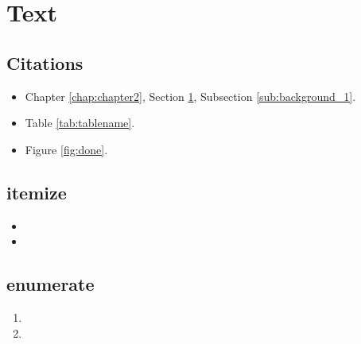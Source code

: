 \documentclass[letterpaper, 12pt, oneside]{book}
\theoremstyle{plain}
\theoremstyle{definition}
\theoremstyle{remark}
\begin{document}
\lipsum[1]

\section{Text} %
\label{sec:text}

\subsection{Citations} %
\label{sub:citations}
\begin{itemize}
\item Chapter \ref{chap:chapter2}, Section \ref{sec:text}, Subsection \ref{sub:background_1}.
\item Table \ref{tab:tablename}.
\item Figure \ref{fig:done}.
\end{itemize}

\subsection{itemize} %
\label{sub:itemize}

\begin{itemize}
\item \lipsum[1]
\item \lipsum[1]
\end{itemize}

\subsection{enumerate} %
\label{sub:enumerate}

\begin{enumerate}
\item \lipsum[1]
\item \lipsum[1]
\end{enumerate}


\renewcommand\bibname{References}


% 
% 
\end{document}
